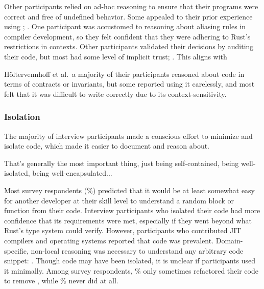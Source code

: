 Other participants relied on ad-hoc reasoning to ensure that their programs were correct and free of undefined behavior. Some appealed to their prior experience using \CC{}; . One participant was accustomed to reasoning about aliasing rules in compiler development, so they felt confident that they were adhering to Rust's restrictions in \unsafe contexts. Other participants validated their decisions by auditing their code, but most had some level of implicit trust; . This aligns with {Höltervennhoff et al.~\cite{holtervennhoff23}\textemdash a majority of their participants reasoned about \unsafe code in terms of contracts or invariants, but some reported using it carelessly, and most felt that it was difficult to write correctly due to its context-sensitivity.

\subsubsection{Isolation}
The majority of interview participants made a conscious effort to minimize and isolate \unsafe code, which made it easier to document and reason about.
\begin{pquote}{10}
That's generally the most important thing, just being self-contained, being well-isolated, being well-encapsulated...
\end{pquote}


Most survey respondents (\understoodeasily\%) predicted that it would be at least somewhat easy for another developer at their skill level to understand a random \unsafe block or function from their code. Interview participants who isolated their \unsafe code had more confidence that its requirements were met, especially if they went beyond what Rust's type system could verify. However, participants who contributed JIT compilers and operating systems reported that \unsafe code was prevalent. Domain-specific, non-local reasoning was necessary to understand any arbitrary \unsafe code snippet: . 
Though \unsafe code may have been isolated, it is unclear if participants used it minimally. Among survey respondents, \rarelyrefactored\% only sometimes refactored their code to remove \unsafe, while \neverrefactored\% never did at all.

}
